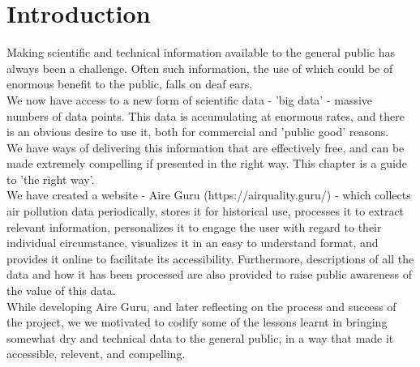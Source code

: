\newpage
\section{Introduction}

Making scientific and technical information available to the general public has always been a challenge.
Often such information, the use of which could be of enormous benefit to the public, falls on deaf ears.\\

We now have access to a new form of scientific data - 'big data' - massive numbers of data points.
This data is accumulating at enormous rates, and there is an obvious desire to use it, both for
commercial and 'public good' reasons.\\

We have ways of delivering this information that are effectively free, and can be made extremely compelling
if presented in the right way. This chapter is a guide to 'the right way'.\\

We have created a website - Aire Guru (https://airquality.guru/) - which collects air pollution data periodically, stores it for historical use, 
processes it to extract relevant information, personalizes it to engage the user with regard to their individual
circumstance, visualizes it in an easy to understand format, and provides it online to facilitate its accessibility. Furthermore,
descriptions of all the data and how it has been processed are also provided to raise public awareness of the value
of this data.\\

While developing Aire Guru, and later reflecting on the process and success of the project, we we motivated to codify
some of the lessons learnt in bringing somewhat dry and technical data to the general public, in a way that made it 
accessible, relevent, and compelling.\\

